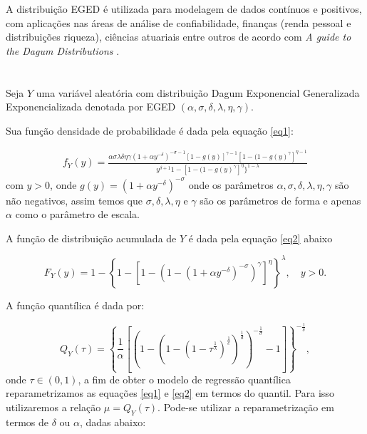 \documentclass{sciposter}
\begin{document}
\begin{multicols}{3}
{A distribuição EGED é utilizada para modelagem de dados contínuos e positivos, com aplicações nas áreas de análise de confiabilidade, finanças (renda pessoal e distribuições riqueza), ciências atuariais entre outros de acordo com \textit{A guide to the Dagum Distributions} \cite{kleiber2008guide} .

\section*{}
\vspace{0.2cm}

Seja $Y$ uma variável aleatória com distribuição Dagum Exponencial Generalizada Exponencializada denotada por EGED $(\alpha,\sigma,\delta,\lambda,\eta,\gamma)$. 

Sua função densidade de probabilidade é dada pela equação \eqref{eq1}:

\begin{align}\label{eq1}
f_Y(y)= \frac{\alpha\sigma\lambda\delta\eta\gamma(1+\alpha y^{-\delta})^{-\sigma-1}[1-g(y)]^{\gamma-1}[1-(1-g(y)^{\gamma}]^{\eta-1}}{y^{\delta+1}{1-[1-(1-g(y)^{\gamma}]^{\eta}\}^{1-\lambda}}}
\end{align}
com $y >0$, onde $g(y) = (1+\alpha y^{-\delta})^{-\sigma}$ onde os parâmetros $\alpha,\sigma,\delta,\lambda,\eta,\gamma$ são não negativos, assim temos que  $\sigma,\delta,\lambda,\eta$ e $\gamma$  são os parâmetros de forma e apenas $\alpha$ como o parâmetro de escala. 

A função de distribuição acumulada de $Y$ é dada pela equação \eqref{eq2} abaixo

\begin{equation}\label{eq2}
F_Y(y)=1-\left\{1-\left[1-\left(1-\left(1+\alpha y^{-\delta}\right)^{-\sigma}\right)^{\gamma}\right]^{\eta}\right\}^{\lambda}, \quad  y > 0.
\end{equation}

A função quantílica é dada por:

\begin{equation}\label{eq3}
Q_Y(\tau)=\left\{\frac{1}{\alpha}\left[\left(1-\left(1-\left(1-\tau^\frac{1}{\lambda}\right)^\frac{1}{c}\right)^{\frac{1}{d}}\right)^{-\frac{1}{\sigma}}-1\right]\right\}^{-\frac{1}{\delta}}, 
\end{equation}
onde $\tau \in (0,1)$, a fim de obter o modelo de regressão quantílica reparametrizamos as equações \eqref{eq1} e \eqref{eq2} em termos do quantil. Para isso utilizaremos a relação $\mu = Q_Y(\tau)$. Pode-se utilizar a reparametrização em termos de $\delta$ ou $\alpha$, dadas abaixo:

}
\end{multicols}
\end{document}
